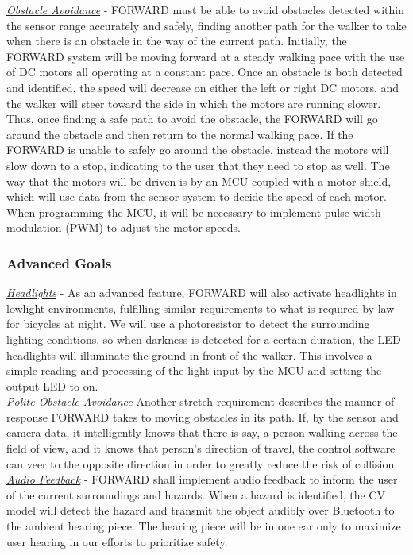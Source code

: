\noindent \underline{\textit{Obstacle Avoidance}} - FORWARD must be able to avoid obstacles detected within the sensor range accurately and safely, finding another path for the walker to take when there is an obstacle in the way of the current path. Initially, the FORWARD system will be moving forward at a steady walking pace with the use of DC motors all operating at a constant pace. Once an obstacle is both detected and identified, the speed will decrease on either the left or right DC motors, and the walker will steer toward the side in which the motors are running slower. Thus, once finding a safe path to avoid the obstacle, the FORWARD will go around the obstacle and then return to the normal walking pace. If the FORWARD is unable to safely go around the obstacle, instead the motors will slow down to a stop, indicating to the user that they need to stop as well. The way that the motors will be driven is by an MCU coupled with a motor shield, which will use data from the sensor system to decide the speed of each motor. When programming the MCU, it will be necessary to implement pulse width modulation (PWM) to adjust the motor speeds.

\subsubsection{Advanced Goals}
\noindent \underline{\textit{Headlights}} - As an advanced feature, FORWARD will also activate headlights in lowlight environments, fulfilling similar requirements to what is required by law for bicycles at night. We will use a photoresistor to detect the surrounding lighting conditions, so when darkness is detected for a certain duration, the LED headlights will illuminate the ground in front of the walker. This involves a simple reading and processing of the light input by the MCU and setting the output LED to on. \\

\noindent \underline{\textit{Polite Obstacle Avoidance}}
Another stretch requirement describes the manner of response FORWARD takes to moving obstacles in its path. If, by the sensor and camera data, it intelligently knows that there is say, a person walking across the field of view, and it knows that person's direction of travel, the control software can veer to the opposite direction in order to greatly reduce the risk of collision.\\

\noindent \underline{\textit{Audio Feedback}} - FORWARD shall implement audio feedback to inform the user of the current surroundings and hazards. When a hazard is identified, the CV model will detect the hazard and transmit the object audibly over Bluetooth to the ambient hearing piece. The hearing piece will be in one ear only to maximize user hearing in our efforts to prioritize safety. \\

